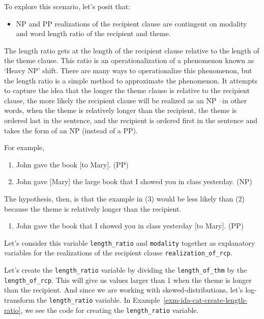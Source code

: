 \documentclass[
  letterpaper,
]{latex/krantz}
\providecommand{\tightlist}{%
  \setlength{\itemsep}{0pt}\setlength{\parskip}{0pt}}\usepackage{longtable,booktabs,array}
\theoremstyle{definition}
\theoremstyle{remark}
\begin{document}
To explore this scenario, let's posit that:

\begin{itemize}
\tightlist
\item
  NP and PP realizations of the recipient clause are contingent on
  modality and word length ratio of the recipient and theme.
\end{itemize}

The length ratio gets at the length of the recipient clause relative to
the length of the theme clause. This ratio is an operationalization of a
phenomenon known as `Heavy NP' shift. There are many ways to
operationalize this phenomenon, but the length ratio is a simple method
to approximate the phenomenon. It attempts to capture the idea that the
longer the theme clause is relative to the recipient clause, the more
likely the recipient clause will be realized as an NP --in other words,
when the theme is relatively longer than the recipient, the theme is
ordered last in the sentence, and the recipient is ordered first in the
sentence and takes the form of an NP (instead of a PP).

For example,

\begin{enumerate}
\def\labelenumi{\arabic{enumi}.}
\tightlist
\item
  John gave the book {[}to Mary{]}. (PP)
\item
  John gave {[}Mary{]} the large book that I showed you in class
  yesterday. (NP)
\end{enumerate}

The hypothesis, then, is that the example in (3) would be less likely
than (2) because the theme is relatively longer than the recipient.

\begin{enumerate}
\def\labelenumi{\arabic{enumi}.}
\setcounter{enumi}{2}
\tightlist
\item
  John gave the book that I showed you in class yesterday {[}to Mary{]}.
  (PP)
\end{enumerate}

Let's consider this variable \texttt{length\_ratio} and
\texttt{modality} together as explanatory variables for the realizations
of the recipient clause \texttt{realization\_of\_rcp}.

Let's create the \texttt{length\_ratio} variable by dividing the
\texttt{length\_of\_thm} by the \texttt{length\_of\_rcp}. This will give
us values larger than 1 when the theme is longer than the recipient. And
since we are working with skewed-distributions, let's log-transform the
\texttt{length\_ratio} variable. In
Example~\ref{exm-ida-cat-create-length-ratio}, we see the code for
creating the \texttt{length\_ratio} variable.
\end{document}

